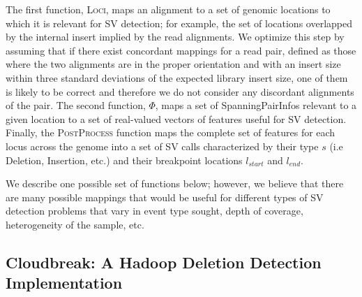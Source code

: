 \documentclass[11pt]{article}
\begin{document}
The first function, \textsc{Loci}, maps an alignment to a set of genomic locations to which it is relevant for SV detection; for example, the set of locations overlapped by the internal insert implied by the read alignments. We optimize this step by assuming that if there exist concordant mappings for a read pair, defined as those where the two alignments are in the proper orientation and with an insert size within three standard deviations of the expected library insert size, one of them is likely to be correct and therefore we do not consider any discordant alignments of the pair. The second function, $\Phi$, maps a set of SpanningPairInfos relevant to a given location to a set of real-valued vectors of features useful for SV detection. Finally, the \textsc{PostProcess} function maps the complete set of features for each locus across the genome into a set of SV calls characterized by their type $s$ (i.e Deletion, Insertion, etc.) and their breakpoint locations $l_{start}$ and $l_{end}$.

We describe one possible set of functions below; however, we believe that there are many possible mappings that would be useful for different types of SV detection problems that vary in event type sought, depth of coverage, heterogeneity of the sample, etc.

\subsection{Cloudbreak: A Hadoop Deletion Detection Implementation}
\end{document}

